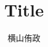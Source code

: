 \documentclass[12pt,a4paper]{bxjsarticle}
\begin{document}
\title{Title}
\author{横山侑政}

\maketitle







\appendix

\end{document}
